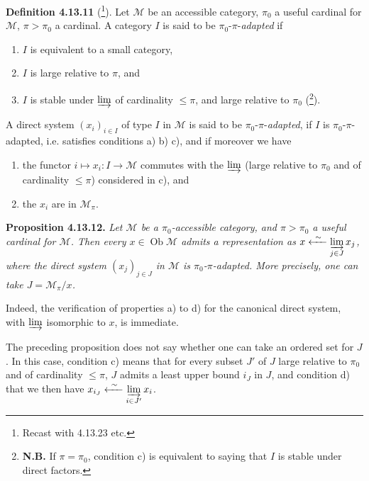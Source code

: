 \documentclass[11pt]{article}
\newcommand{\printedpage}[1]{\marginpar{\footnotesize p.~#1}}
\newcommand{\msp}[1]{\marginpar{\footnotesize [#1]}}
\newcommand{\ilim}{\varinjlim\limits}
\newcommand{\Ob}{\operatorname{Ob}}
\begin{document}
\printedpage{114}

\msp{page 303}\noindent\textbf{Definition 4.13.11} (\footnote[132]{Recast with 4.13.23 etc.}). Let $\mathcal{M}$ be an accessible category, $\pi_0$ a useful cardinal for $\mathcal{M}$, $\pi > \pi_0$ a cardinal. A category $I$ is said to be $\pi_0$-$\pi$-\textit{adapted} if
\begin{enumerate}
\item[a)] $I$ is equivalent to a small category,
\item[b)] $I$ is large relative to $\pi$, and
\item[c)] $I$ is stable under $\varinjlim$ of cardinality $\leqslant \pi$, and large relative to $\pi_0$ (\footnote[133]{\textbf{N.B.} If $\pi = \pi_0$, condition c) is equivalent to saying that $I$ is stable under direct factors.}).
\end{enumerate}
\noindent A direct system $(x_i)_{i\in I}$ of type $I$ in $\mathcal{M}$ is said to be $\pi_0$-$\pi$-\textit{adapted}, if $I$ is $\pi_0$-$\pi$-adapted, i.e. satisfies conditions a) b) c), and if moreover we have
\begin{enumerate}
\item[d)] the functor $i \longmapsto x_i : I \longrightarrow \mathcal{M}$ commutes with the $\varinjlim$ (large relative to $\pi_0$ and of cardinality $\leqslant \pi$) considered in c), and
\item[e)] the $x_i$ are in $\mathcal{M}_\pi$.
\end{enumerate}

\noindent\textbf{Proposition 4.13.12.} \textit{Let $\mathcal{M}$ be a $\pi_0$-accessible category, and $\pi > \pi_0$ a useful cardinal for $\mathcal{M}$. Then every $x \in \Ob\mathcal{M}$ admits a representation as $x \xleftarrow{\ \sim\ } \ilim_{j\in J} x_j$, where the direct system $(x_j)_{j\in J}$ in $\mathcal{M}$ is $\pi_0$-$\pi$-adapted. More precisely, one can take $J = \mathcal{M}_\pi/x$.}

\msp{page 304}\noindent Indeed, the verification of properties a) to d) for the canonical direct system, with $\varinjlim$ isomorphic to $x$, is immediate.

The preceding proposition does not say whether one can take an ordered set for $J$. In this case, condition c) means that for every subset $J'$ of $J$ large relative to $\pi_0$ and of cardinality $\leqslant \pi$, $J$ admits a least upper bound $i_J$ in $J$, and condition d) that we then have $x_{i_J} \xleftarrow{\ \sim\ } \ilim_{i\in J'} x_i$.
\end{document}
